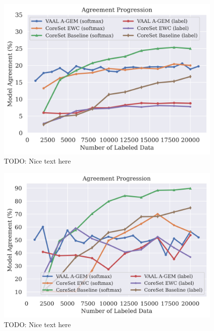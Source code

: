 \begin{figure}[h]
    \centering
    \includegraphics[width=0.8\linewidth]{images/results_CALMS/cifar100_vaal_agem.png}
    \caption[Agreement Comparison for Model Stealing on CIFAR-100 using VAAL and AGEM]{TODO: Nice text here}
    \label{fig:CALMScifar100VAAL_AGEM}
\end{figure}

\begin{figure}[h]
    \centering
    \includegraphics[width=0.8\linewidth]{images/results_CALMS/mnist_vaal_agem.png}
    \caption[Agreement Comparison for Model Stealing on MNIST using VAAL and AGEM]{TODO: Nice text here}
    \label{fig:CALMSmnistVAAL_AGEM}
\end{figure}
